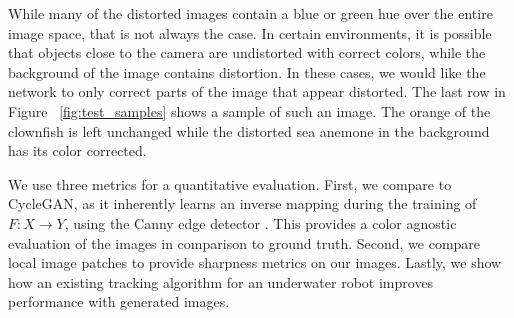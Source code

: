 \documentclass[letterpaper, 10pt, conference]{ieeeconf}
\begin{document}
While many of the distorted images contain a blue or green hue over the entire image space, that is not always the case.
In certain environments,
it is possible that objects close to the camera are undistorted with correct colors, while the background
of the image contains distortion. In these cases, we would like the network to only correct parts of the image that
appear distorted. The last row in Figure ~\ref{fig:test_samples} shows a sample of such an image. The orange of the clownfish is 
left
unchanged while the distorted sea anemone in the background has its color corrected.

We use three metrics for a quantitative evaluation. First, we compare to CycleGAN, as it inherently learns an inverse
mapping during the training of $F: X \rightarrow Y$, using the Canny edge detector
\cite{canny1986computational}. This provides a color agnostic evaluation of the images in comparison to ground truth.
Second, we compare local image patches to provide sharpness metrics on our images. Lastly, we show how an existing
tracking algorithm for an underwater robot improves performance with generated images.
\end{document}
